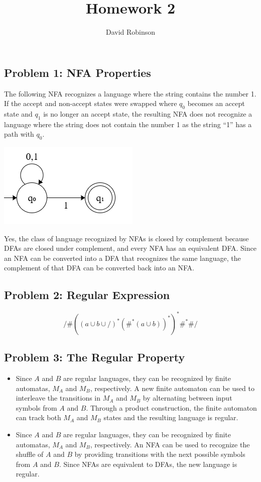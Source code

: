 \documentclass{article}
\title{Homework 2}
\author{David Robinson}
\date{}
\begin{document}
\maketitle

\subsection*{Problem 1: NFA Properties}
The following NFA recognizes a language where the string contains the number 1. If the accept and non-accept states were swapped where $q_0$ becomes an accept state and $q_1$ is no longer an accept state, the resulting NFA does not recognize a language where the string does not contain the number 1 as the string ``1'' has a path with $q_0$.

\begin{center}
    \includegraphics[scale=0.65]{nfa.png}
\end{center}

Yes, the class of language recognized by NFAs is closed by complement because DFAs are closed under complement, and every NFA has an equivalent DFA. Since an NFA can be converted into a DFA that recognizes the same language, the complement of that DFA can be converted back into an NFA.

\subsection*{Problem 2: Regular Expression}

\[/\#{({(a\cup b\cup /)}^*{(\#^*(a\cup b))}^*)}^* \#^*\#/\]

\subsection*{Problem 3: The Regular Property}

\begin{itemize}
    \item Since $A$ and $B$ are regular languages, they can be recognized by finite automatas, $M_A$ and $M_B$, respectively. A new finite automaton can be used to interleave the transitions in $M_A$ and $M_B$ by alternating between input symbols from $A$ and $B$. Through a product construction, the finite automaton can track both $M_A$ and $M_B$ states and the resulting language is regular.
    \item Since $A$ and $B$ are regular languages, they can be recognized by finite automatas, $M_A$ and $M_B$, respectively. An NFA can be used to recognize the shuffle of $A$ and $B$ by providing transitions with the next possible symbols from $A$ and $B$. Since NFAs are equivalent to DFAs, the new language is regular.
\end{itemize}
\end{document}
